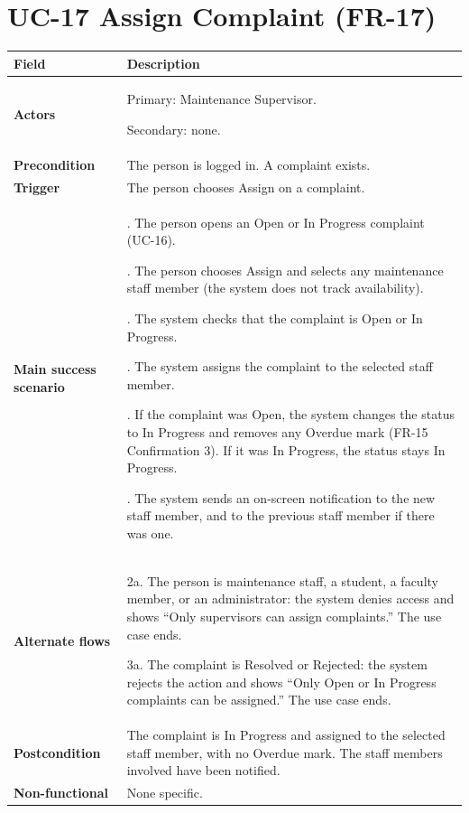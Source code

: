 \documentclass[11pt,a4paper]{report}
\begin{document}
\section{UC-17 Assign Complaint (FR-17)}
\begin{longtable}{|>{\raggedright\arraybackslash}p{3.0cm}|>{\raggedright\arraybackslash}p{12.4cm}|}
\hline \textbf{Field} & \textbf{Description} \\ \hline \endhead
\textbf{Actors} & Primary: Maintenance Supervisor.\par\smallskip Secondary: none. \\ \hline
\textbf{Precondition} & The person is logged in. A complaint exists. \\ \hline
\textbf{Trigger} & The person chooses Assign on a complaint. \\ \hline
\textbf{Main success scenario} & 1. The person opens an Open or In Progress complaint (UC-16).\par\smallskip 2. The person chooses Assign and selects any maintenance staff member (the system does not track availability).\par\smallskip 3. The system checks that the complaint is Open or In Progress.\par\smallskip 4. The system assigns the complaint to the selected staff member.\par\smallskip 5. If the complaint was Open, the system changes the status to In Progress and removes any Overdue mark (FR-15 Confirmation 3). If it was In Progress, the status stays In Progress.\par\smallskip 6. The system sends an on-screen notification to the new staff member, and to the previous staff member if there was one. \\ \hline
\textbf{Alternate flows} & 2a. The person is maintenance staff, a student, a faculty member, or an administrator: the system denies access and shows ``Only supervisors can assign complaints.'' The use case ends.\par\smallskip 3a. The complaint is Resolved or Rejected: the system rejects the action and shows ``Only Open or In Progress complaints can be assigned.'' The use case ends. \\ \hline
\textbf{Postcondition} & The complaint is In Progress and assigned to the selected staff member, with no Overdue mark. The staff members involved have been notified. \\ \hline
\textbf{Non-functional} & None specific. \\ \hline
\end{longtable}
\end{document}
